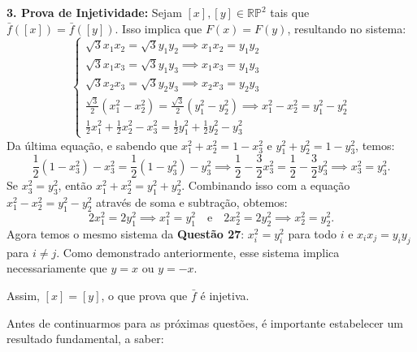 {	\textbf{3. Prova de Injetividade:}
	Sejam $[x], [y] \in \mathbb{RP}^2$ tais que $\bar{f}([x]) = \bar{f}([y])$. Isso implica que $F(x) = F(y)$, resultando no sistema:
	\begin{equation*}
		\begin{cases}
			\sqrt{3}x_1x_2 = \sqrt{3}y_1y_2 \implies x_1x_2 = y_1y_2 \\
			\sqrt{3}x_1x_3 = \sqrt{3}y_1y_3 \implies x_1x_3 = y_1y_3 \\
			\sqrt{3}x_2x_3 = \sqrt{3}y_2y_3 \implies x_2x_3 = y_2y_3 \\
			\frac{\sqrt{3}}{2}(x_1^2 - x_2^2) = \frac{\sqrt{3}}{2}(y_1^2 - y_2^2) \implies x_1^2 - x_2^2 = y_1^2 - y_2^2 \\
			\frac{1}{2}x_1^2 + \frac{1}{2}x_2^2 - x_3^2 = \frac{1}{2}y_1^2 + \frac{1}{2}y_2^2 - y_3^2
		\end{cases}
	\end{equation*}
	Da última equação, e sabendo que $x_1^2 + x_2^2 = 1 - x_3^2$ e $y_1^2 + y_2^2 = 1 - y_3^2$, temos:
	\begin{equation*}
		\frac{1}{2}(1 - x_3^2) - x_3^2 = \frac{1}{2}(1 - y_3^2) - y_3^2 \implies \frac{1}{2} - \frac{3}{2}x_3^2 = \frac{1}{2} - \frac{3}{2}y_3^2 \implies x_3^2 = y_3^2.
	\end{equation*}
	Se $x_3^2 = y_3^2$, então $x_1^2 + x_2^2 = y_1^2 + y_2^2$. Combinando isso com a equação $x_1^2 - x_2^2 = y_1^2 - y_2^2$ através de soma e subtração, obtemos:
	\begin{equation*}
		2x_1^2 = 2y_1^2 \implies x_1^2 = y_1^2 \quad \text{e} \quad 2x_2^2 = 2y_2^2 \implies x_2^2 = y_2^2.
	\end{equation*}
	Agora temos o mesmo sistema da \textbf{Questão 27}: $x_i^2 = y_i^2$ para todo $i$ e $x_i x_j = y_i y_j$ para $i \neq j$. Como demonstrado anteriormente, esse sistema implica necessariamente que $y = x$ ou $y = -x$.
	
	Assim, $[x] = [y]$, o que prova que $\bar{f}$ é injetiva.
}
Antes de continuarmos para as próximas questões, é importante estabelecer um resultado fundamental, a saber:
	
